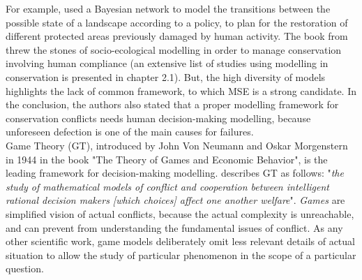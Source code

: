 \documentclass[12pt,a4paper]{article}
\begin{document}
For example, \cite{rumpff2011state} used a Bayesian network to model the transitions between the possible state of a landscape according to a policy, to plan for the restoration of different protected areas previously damaged by human activity. %
The book from \cite{schluter2012new} threw the stones of socio-ecological modelling in order to manage conservation involving human compliance (an extensive list of studies using modelling in conservation is presented in chapter 2.1).
But, the high diversity of models highlights the lack of common framework, to which MSE is a strong candidate. %
In the conclusion, the authors also stated that a proper modelling framework for conservation conflicts needs human decision-making modelling, because unforeseen defection is one of the main causes for failures.\\
%

Game Theory (GT), introduced by John Von Neumann and Oskar Morgenstern in 1944 in the book "The Theory of Games and Economic Behavior", is the leading framework for decision-making modelling.
\cite{myerson1997game} describes GT as follows: "\textit{the study of mathematical models of conflict and cooperation between intelligent rational decision makers [which choices] affect one another welfare}". %
\textit{Games} are simplified vision of actual conflicts, because the actual complexity is unreachable, and can prevent from understanding the fundamental issues of conflict. %
As any other scientific work, game models deliberately omit less relevant details of actual situation to allow the study of particular phenomenon in the scope of a particular question.
\end{document}
